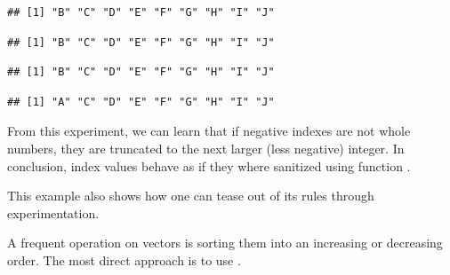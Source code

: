 \documentclass[krantz2]{krantz}\usepackage{knitr}
\begin{document}
\begin{explainbox}
\begin{knitrout}\footnotesize
{}\color{fgcolor}\begin{kframe}
\begin{alltt}
 \hlkwb{<-} \hlstd{LETTERS[}\hlopt{:}\hlstd{]}
\hlstd{b[}\hlopt{-}\hlstd{]}
\end{alltt}
\begin{verbatim}
## [1] "B" "C" "D" "E" "F" "G" "H" "I" "J"
\end{verbatim}
\begin{alltt}
\hlstd{b[}\hlopt{-}\hlstd{]}
\end{alltt}
\begin{verbatim}
## [1] "B" "C" "D" "E" "F" "G" "H" "I" "J"
\end{verbatim}
\begin{alltt}
\hlstd{b[}\hlopt{-}\hlstd{]}
\end{alltt}
\begin{verbatim}
## [1] "B" "C" "D" "E" "F" "G" "H" "I" "J"
\end{verbatim}
\begin{alltt}
\hlstd{b[}\hlopt{-}\hlstd{]}
\end{alltt}
\begin{verbatim}
## [1] "A" "C" "D" "E" "F" "G" "H" "I" "J"
\end{verbatim}
\end{kframe}
\end{knitrout}

From this experiment, we can learn that if negative indexes are not whole numbers, they are truncated to the next larger (less negative) integer. In conclusion,  index values behave as if they where sanitized using function .

This example also shows how one can tease out of \Rlang its rules through experimentation.

\end{explainbox}

A frequent operation on vectors is sorting them into an increasing or decreasing order. The most direct approach is to use .
\end{document}
